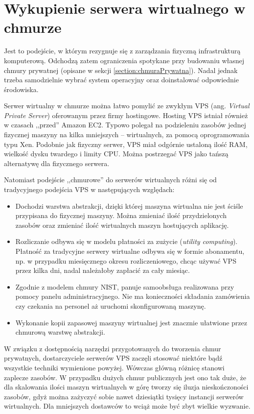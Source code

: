 \documentclass[12pt,a4paper,twoside,titlepage,openright]{book}
\begin{document}
\section{Wykupienie serwera wirtualnego w chmurze}\label{section:podejscieVm}

Jest to podejście, w którym rezygnuje się z zarządzania fizyczną infrastrukturą komputerową. Odchodzą zatem ograniczenia spotykane przy budowaniu własnej chmury prywatnej (opisane w sekcji  \ref{section:chmuraPrywatna}). Nadal jednak trzeba samodzielnie wybrać system operacyjny oraz doinstalować odpowiednie środowiska.

Serwer wirtualny w chmurze można łatwo pomylić ze zwykłym VPS (ang. \textit{Virtual Private Server}) oferowanym przez firmy hostingowe. Hosting VPS istniał również w czasach ,,przed'' Amazon EC2. Typowo polegał na podzieleniu zasobów jednej fizycznej maszyny na kilka mniejszych -- wirtualnych, za pomocą oprogramowania typu Xen. Podobnie jak fizyczny serwer, VPS miał odgórnie ustaloną ilość RAM, wielkość dysku twardego i limity CPU. Można postrzegać VPS jako tańszą alternatywę dla fizycznego serwera. 

Natomiast podejście ,,chmurowe'' do serwerów wirtualnych różni się od tradycyjnego podejścia VPS w następujących względach:
\begin{itemize}
\item Dochodzi warstwa abstrakcji, dzięki której maszyna wirtualna nie jest ściśle przypisana do fizycznej maszyny. Można zmieniać ilość przydzielonych zasobów oraz zmieniać ilość wirtualnych maszyn hostujących aplikację.
\item Rozliczanie odbywa się w modelu płatności za zużycie (\textit{utility computing}). Płatność za tradycyjne serwery wirtualne odbywa się w formie abonamentu, np. w przypadku miesięcznego okresu rozliczeniowego, chcąc używać VPS przez kilka dni, nadal należałoby zapłacić za cały miesiąc.
\item Zgodnie z modelem chmury NIST, panuje samoobsługa realizowana przy pomocy panelu administracyjnego. Nie ma konieczności składania zamówienia czy czekania na personel aż uruchomi skonfigurowaną maszynę.
\item Wykonanie kopii zapasowej maszyny wirtualnej jest znacznie ułatwione przez chmurową warstwę abstrakcji. 
\end{itemize}

W związku z dostępnością narzędzi przygotowanych do tworzenia chmur prywatnych, dostarczyciele serwerów VPS zaczęli stosować niektóre bądź wszystkie techniki wymienione powyżej. Wówczas główną różnicę stanowi zaplecze zasobów. W przypadku dużych chmur publicznych jest ono tak duże, że dla skalowania ilości maszyn wirtualnych w górę tworzy się iluzja nieskończoności zasobów, gdyż można zażyczyć sobie nawet dziesiątki tysięcy instancji serwerów wirtualnych. Dla mniejszych dostawców to wciąż może być zbyt wielkie wyzwanie.
\end{document}
